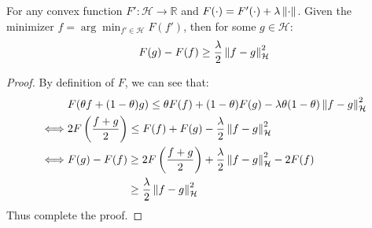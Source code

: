 \begin{lemma}
    For any convex function $F':\mathcal{H}\rightarrow \mathbb{R}$ and $F(\cdot) = F'(\cdot) + \lambda\left\lVert\cdot\right\rVert$. Given the minimizer $f=\arg\min_{f'\in\mathcal{H}}F(f')$, then for some $g\in\mathcal{H}$:
    \begin{equation*}
        F(g) - F(f) \ge \frac{\lambda}{2}\left\lVert f-g\right\rVert^2_\mathcal{H} 
    \end{equation*}
\end{lemma}
\begin{proof}
    By definition of $F$, we can see that:
    \begin{equation*}
    \begin{aligned}
        &F(\theta f + (1-\theta)g) \le \theta F(f) + (1-\theta)F(g) -\lambda\theta(1-\theta)\left\lVert f-g\right\rVert^2_\mathcal{H}\\
        \iff&  2F\left( \frac{f+g}{2} \right) \le F(f) + F(g) - \frac{\lambda}{2}\left\lVert f-g\right\rVert^2_\mathcal{H} \\
        \iff&  \begin{aligned}[t]
            F(g) - F(f) &\ge 2F\left( \frac{f+g}{2} \right) + \frac{\lambda}{2}\left\lVert f-g\right\rVert^2_\mathcal{H} - 2F(f) \\
            &\ge\frac{\lambda}{2}\left\lVert f-g\right\rVert^2_\mathcal{H}
        \end{aligned}
    \end{aligned}
    \end{equation*}
    Thus complete the proof.
\end{proof}

